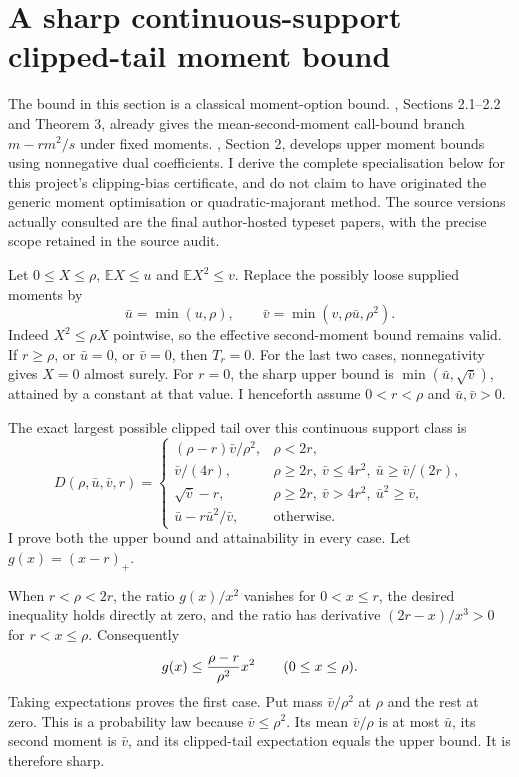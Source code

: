 \section{A sharp continuous-support clipped-tail moment bound}
\label{sec:sharp-clipping-moment}

The bound in this section is a classical moment-option bound. \citet{bertsimaspopescu2002}, Sections 2.1--2.2 and Theorem 3, already gives the mean-second-moment call-bound branch \(m-rm^2/s\) under fixed moments. \citet{bertsimaspopescu2005}, Section 2, develops upper moment bounds using nonnegative dual coefficients. I derive the complete specialisation below for this project's clipping-bias certificate, and do not claim to have originated the generic moment optimisation or quadratic-majorant method. The source versions actually consulted are the final author-hosted typeset papers, with the precise scope retained in the source audit.

Let \(0\leq X\leq\rho\), \(\mathbb EX\leq u\) and \(\mathbb EX^2\leq v\). Replace the possibly loose supplied moments by
\[
 \bar u=\min(u,\rho),\qquad
 \bar v=\min(v,\rho\bar u,\rho^2).
 \tag{C2}\label{eq:clip-effective-moments}
\]
Indeed \(X^2\leq\rho X\) pointwise, so the effective second-moment bound remains valid. If \(r\geq\rho\), or \(\bar u=0\), or \(\bar v=0\), then \(T_r=0\). For the last two cases, nonnegativity gives \(X=0\) almost surely. For \(r=0\), the sharp upper bound is \(\min(\bar u,\sqrt{\bar v})\), attained by a constant at that value. I henceforth assume \(0<r<\rho\) and \(\bar u,\bar v>0\).

The exact largest possible clipped tail over this continuous support class is
\[
 D(\rho,\bar u,\bar v,r)=
 \begin{cases}
 (\rho-r)\bar v/\rho^2,&\rho<2r,\\
 \bar v/(4r),&\rho\geq2r,\ \bar v\leq4r^2,
                    \ \bar u\geq\bar v/(2r),\\
 \sqrt{\bar v}-r,&\rho\geq2r,\ \bar v>4r^2,
                    \ \bar u^2\geq\bar v,\\
 \bar u-r\bar u^2/\bar v,&\text{otherwise}.
 \end{cases}
 \tag{C3}\label{eq:sharp-clipped-tail}
\]
I prove both the upper bound and attainability in every case. Let \(g(x)=(x-r)_+\).

When \(r<\rho<2r\), the ratio \(g(x)/x^2\) vanishes for \(0<x\leq r\), the desired inequality holds directly at zero, and the ratio has derivative \((2r-x)/x^3>0\) for \(r<x\leq\rho\). Consequently
\[
 g(x)\leq{\rho-r\over\rho^2}x^2
 \qquad(0\leq x\leq\rho).
\]
Taking expectations proves the first case. Put mass \(\bar v/\rho^2\) at \(\rho\) and the rest at zero. This is a probability law because \(\bar v\leq\rho^2\). Its mean \(\bar v/\rho\) is at most \(\bar u\), its second moment is \(\bar v\), and its clipped-tail expectation equals the upper bound. It is therefore sharp.

